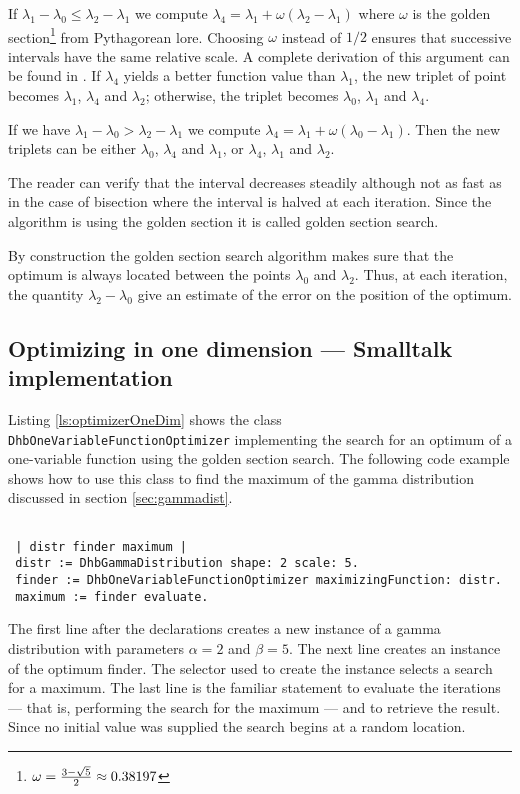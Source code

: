 \documentclass[twoside]{book}
\begin{document}
If $\lambda_1-\lambda_0\leq\lambda_2-\lambda_1$ we compute
$\lambda_4 =\lambda_1 + \omega\left(\lambda_2-\lambda_1\right)$
where $\omega$ is the golden
section\footnote{$\omega={3-\sqrt{5}\over 2}\approx0.38197$} from
Pythagorean lore. Choosing $\omega$ instead of $1/2$ ensures that
successive intervals have the same relative scale. A complete
derivation of this argument can be found in \cite{Press}. If
$\lambda_4$ yields a better function value than $\lambda_1$, the
new triplet of point becomes $\lambda_1$, $\lambda_4$ and
$\lambda_2$; otherwise, the triplet becomes $\lambda_0$,
$\lambda_1$ and $\lambda_4$.

If we have $\lambda_1-\lambda_0>\lambda_2-\lambda_1$ we compute
$\lambda_4 =\lambda_1 + \omega\left(\lambda_0-\lambda_1\right)$.
Then the new triplets can be either $\lambda_0$, $\lambda_4$ and
$\lambda_1$, or $\lambda_4$, $\lambda_1$ and $\lambda_2$.


The reader can verify that the interval decreases steadily
although not as fast as in the case of bisection where the
interval is halved at each iteration. Since the algorithm is using
the golden section it is called golden section search.

By construction the golden section search algorithm makes sure
that the optimum is always located between the points $\lambda_0$
and $\lambda_2$. Thus, at each iteration, the quantity
$\lambda_2-\lambda_0$ give an estimate of the error on the
position of the optimum.

\subsection{Optimizing in one dimension --- Smalltalk implementation}
 Listing
\ref{ls:optimizerOneDim} shows the class {\tt
DhbOneVariableFunctionOptimizer} implementing the search for an
optimum of a one-variable function using the golden section
search. The following code example shows how to use this class to
find the maximum of the gamma distribution discussed in section
\ref{sec:gammadist}.
\begin{codeExample}
\begin{verbatim}

 | distr finder maximum |
 distr := DhbGammaDistribution shape: 2 scale: 5.
 finder := DhbOneVariableFunctionOptimizer maximizingFunction: distr.
 maximum := finder evaluate.
\end{verbatim}
\end{codeExample}
The first line after the declarations creates a new instance of a
gamma distribution with parameters $\alpha = 2$ and $\beta = 5$.
The next line creates an instance of the optimum finder. The
selector used to create the instance selects a search for a
maximum. The last line is the familiar statement to evaluate the
iterations --- that is, performing the search for the maximum ---
and to retrieve the result. Since no initial value was supplied
the search begins at a random location.
\end{document}
